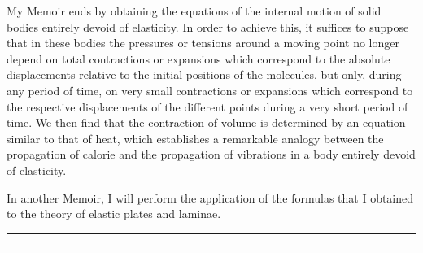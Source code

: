 \documentclass[leqno,openright,smallroyalvopaper,8pt,twoside,showtrims]{memoir}
\begin{document}
My Memoir ends by obtaining the equations of the internal motion of solid bodies entirely devoid of elasticity. In order to achieve this, it suffices to suppose that in these bodies the pressures or tensions around a moving point no longer depend on total contractions or expansions which correspond to the absolute displacements relative to the initial positions of the molecules, but only, during any period of time, on very small contractions or expansions which correspond to the respective displacements of the different points during a very short period of time. We then find that the contraction of volume is determined by an equation similar to that of heat, which establishes a remarkable analogy between the propagation of calorie and the propagation of vibrations in a body entirely devoid of elasticity.

In another Memoir, I will perform the application of the formulas that I obtained to the theory of elastic plates and laminae.

\vspace*{.5cm}
\noindent
\rule{\textwidth}{0.5pt}\vspace*{-\baselineskip}\vspace*{2pt} 
\rule{\textwidth}{0.5pt} 
\end{document}
